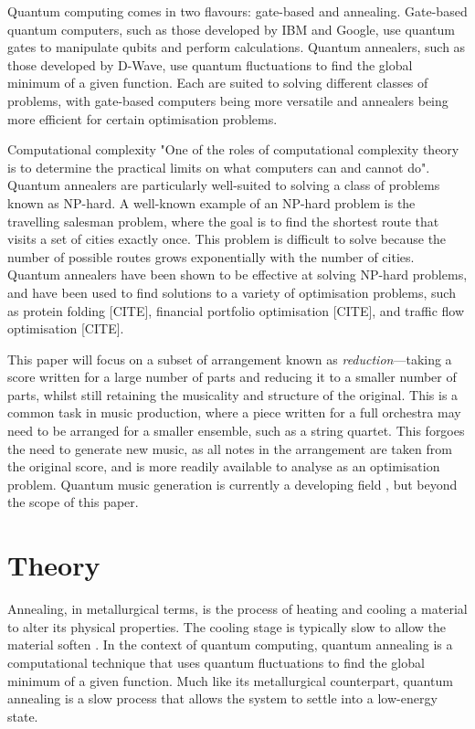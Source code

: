 \documentclass[aps,pra,10pt,twocolumn]{revtex4-2}
\begin{document}
Quantum computing comes in two flavours: gate-based and annealing. Gate-based quantum computers, such as those developed by IBM and Google, use quantum gates to manipulate qubits and perform calculations. Quantum annealers, such as those developed by D-Wave, use quantum fluctuations to find the global minimum of a given function. Each are suited to solving different classes of problems, with gate-based computers being more versatile and annealers being more efficient for certain optimisation problems. 

Computational complexity "One of the roles of computational complexity theory is to determine the practical limits on what computers can and cannot do". Quantum annealers are particularly well-suited to solving a class of problems known as NP-hard. A well-known example of an NP-hard problem is the travelling salesman problem, where the goal is to find the shortest route that visits a set of cities exactly once. This problem is difficult to solve because the number of possible routes grows exponentially with the number of cities. Quantum annealers have been shown to be effective at solving NP-hard problems, and have been used to find solutions to a variety of optimisation problems, such as protein folding [CITE], financial portfolio optimisation [CITE], and traffic flow optimisation [CITE].

This paper will focus on a subset of arrangement known as \textit{reduction}—taking a score written for a large number of parts and reducing it to a smaller number of parts, whilst still retaining the musicality and structure of the original. This is a common task in music production, where a piece written for a full orchestra may need to be arranged for a smaller ensemble, such as a string quartet. This forgoes the need to generate new music, as all notes in the arrangement are taken from the original score, and is more readily available to analyse as an optimisation problem. Quantum music generation is currently a developing field \cite{miranda_quantum_2022}, but beyond the scope of this paper. 

\section{Theory} 

Annealing, in metallurgical terms, is the process of heating and cooling a material to alter its physical properties. The cooling stage is typically slow to allow the material soften \cite{oed_annealing_2024}. In the context of quantum computing, quantum annealing is a computational technique that uses quantum fluctuations to find the global minimum of a given function. Much like its metallurgical counterpart, quantum annealing is a slow process that allows the system to settle into a low-energy state.
\end{document}
